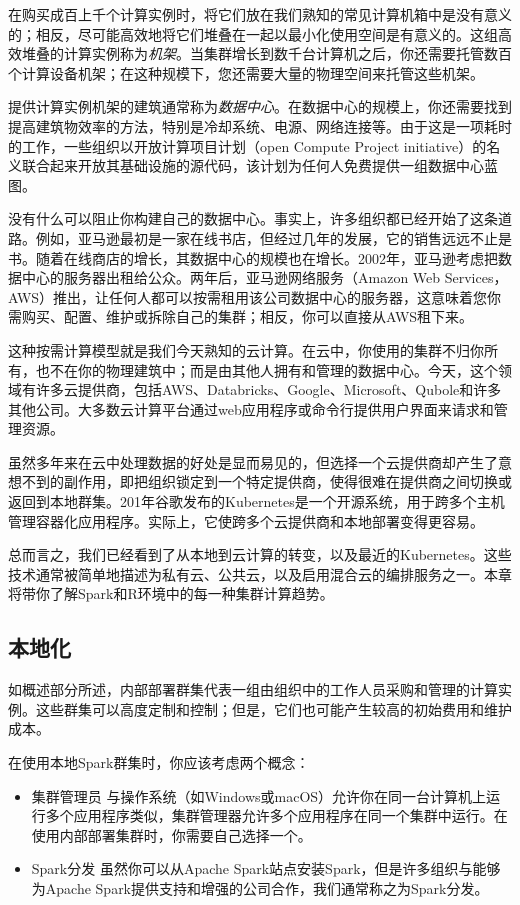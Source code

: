 \documentclass[
]{article}
\providecommand{\tightlist}{%
  \setlength{\itemsep}{0pt}\setlength{\parskip}{0pt}}
\begin{document}
在购买成百上千个计算实例时，将它们放在我们熟知的常见计算机箱中是没有意义的；相反，尽可能高效地将它们堆叠在一起以最小化使用空间是有意义的。这组高效堆叠的计算实例称为\emph{机架}。当集群增长到数千台计算机之后，你还需要托管数百个计算设备机架；在这种规模下，您还需要大量的物理空间来托管这些机架。

提供计算实例机架的建筑通常称为\emph{数据中心}。在数据中心的规模上，你还需要找到提高建筑物效率的方法，特别是冷却系统、电源、网络连接等。由于这是一项耗时的工作，一些组织以开放计算项目计划（open
Compute Project
initiative）的名义联合起来开放其基础设施的源代码，该计划为任何人免费提供一组数据中心蓝图。

没有什么可以阻止你构建自己的数据中心。事实上，许多组织都已经开始了这条道路。例如，亚马逊最初是一家在线书店，但经过几年的发展，它的销售远远不止是书。随着在线商店的增长，其数据中心的规模也在增长。2002年，亚马逊考虑把数据中心的服务器出租给公众。两年后，亚马逊网络服务（Amazon
Web
Services，AWS）推出，让任何人都可以按需租用该公司数据中心的服务器，这意味着您你需购买、配置、维护或拆除自己的集群；相反，你可以直接从AWS租下来。

这种按需计算模型就是我们今天熟知的云计算。在云中，你使用的集群不归你所有，也不在你的物理建筑中；而是由其他人拥有和管理的数据中心。今天，这个领域有许多云提供商，包括AWS、Databricks、Google、Microsoft、Qubole和许多其他公司。大多数云计算平台通过web应用程序或命令行提供用户界面来请求和管理资源。

虽然多年来在云中处理数据的好处是显而易见的，但选择一个云提供商却产生了意想不到的副作用，即把组织锁定到一个特定提供商，使得很难在提供商之间切换或返回到本地群集。201年谷歌发布的Kubernetes是一个开源系统，用于跨多个主机管理容器化应用程序。实际上，它使跨多个云提供商和本地部署变得更容易。

总而言之，我们已经看到了从本地到云计算的转变，以及最近的Kubernetes。这些技术通常被简单地描述为私有云、公共云，以及启用混合云的编排服务之一。本章将带你了解Spark和R环境中的每一种集群计算趋势。

\hypertarget{ux672cux5730ux5316}{%
\subsection{本地化}\label{ux672cux5730ux5316}}

如概述部分所述，内部部署群集代表一组由组织中的工作人员采购和管理的计算实例。这些群集可以高度定制和控制；但是，它们也可能产生较高的初始费用和维护成本。

在使用本地Spark群集时，你应该考虑两个概念：

\begin{itemize}
\tightlist
\item
  集群管理员
  与操作系统（如Windows或macOS）允许你在同一台计算机上运行多个应用程序类似，集群管理器允许多个应用程序在同一个集群中运行。在使用内部部署集群时，你需要自己选择一个。
\item
  Spark分发 虽然你可以从Apache
  Spark站点安装Spark，但是许多组织与能够为Apache
  Spark提供支持和增强的公司合作，我们通常称之为Spark分发。
\end{itemize}
\end{document}
